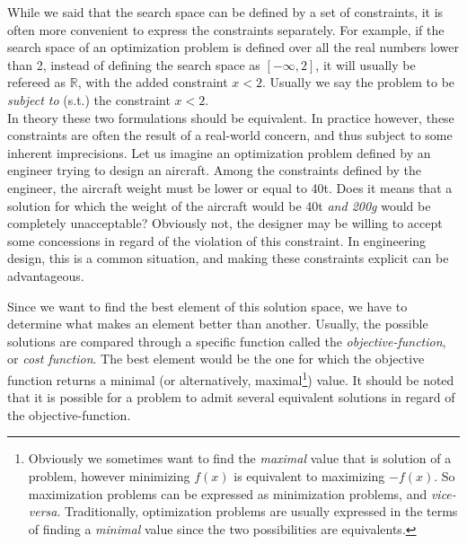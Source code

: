 While we said that the search space can be defined by a set of constraints, it is often more convenient to express the constraints separately. For example, if the search space of an optimization problem is defined over all the real numbers lower than 2, instead of defining the search space as $[-\infty, 2]$, it will usually be refereed as $\mathbb{R}$, with the added constraint $x < 2$. Usually we say the problem to be \emph{subject to} (s.t.) the constraint $x < 2$.\\
In theory these two formulations should be equivalent. In practice however, these constraints are often the result of a real-world concern, and thus subject to some inherent imprecisions. Let us imagine an optimization problem defined by an engineer trying to design an aircraft. Among the constraints defined by the engineer, the aircraft weight must be lower or equal to 40t. Does it means that a solution for which the weight of the aircraft would be 40t \emph{and 200g} would be completely unacceptable? Obviously not, the designer may be willing to accept some concessions in regard of the violation of this constraint. In engineering design, this is a common situation, and making these constraints explicit can be advantageous.

Since we want to find the best element of this solution space, we have to determine what makes an element better than another. Usually, the possible solutions are compared through a specific function called the \emph{objective-function}, or \emph{cost function}. The best element would be the one for which the objective function returns a minimal (or alternatively, maximal\footnote{Obviously we sometimes want to find the \emph{maximal} value that is solution of a problem, however minimizing $f(x)$ is equivalent to maximizing $-f(x)$. So maximization problems can be expressed as minimization problems, and \emph{vice-versa}. Traditionally, optimization problems are usually expressed in the terms of finding a \emph{minimal} value since the two possibilities are equivalents.}) value. It should be noted that it is possible for a problem to admit several equivalent solutions in regard of the objective-function.


